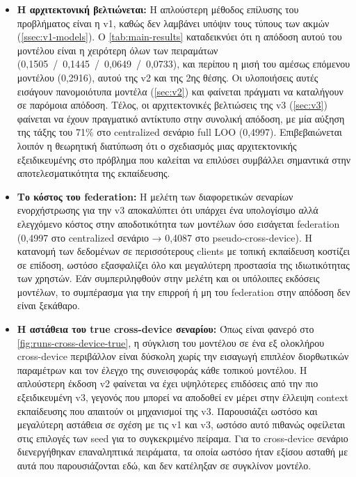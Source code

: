 \begin{itemize}
    \item \textbf{Η αρχιτεκτονική βελτιώνεται:} Η απλούστερη μέθοδος επίλυσης του προβλήματος είναι η v1, καθώς δεν λαμβάνει υπόψιν τους τύπους των ακμών (\autoref{ssec:v1-models}). Ο \autoref{tab:main-results} καταδεικνύει ότι η απόδοση αυτού του μοντέλου είναι η χειρότερη όλων των πειραμάτων (0,1505~/~0,1445~/~0,0649~/~0,0733), και περίπου η μισή του αμέσως επόμενου μοντέλου (0,2916), αυτού της v2 και της 2ης θέσης. Οι υλοποιήσεις αυτές εισάγουν πανομοιότυπα μοντέλα (\autoref{sec:v2}) και φαίνεται πράγματι να καταλήγουν σε παρόμοια απόδοση. Τέλος, οι αρχιτεκτονικές βελτιώσεις της v3 (\autoref{sec:v3}) φαίνεται να έχουν πραγματικό αντίκτυπο στην συνολική απόδοση, με μία αύξηση της τάξης του 71\% στο centralized σενάριο full LOO (0,4997). Επιβεβαιώνεται λοιπόν η θεωρητική διατύπωση ότι ο σχεδιασμός μιας αρχιτεκτονικής εξειδικευμένης στο πρόβλημα που καλείται να επιλύσει συμβάλλει σημαντικά στην αποτελεσματικότητα της εκπαίδευσης.
    \item \textbf{Το κόστος του federation:} Η μελέτη των διαφορετικών σεναρίων ενορχήστρωσης για την v3 αποκαλύπτει ότι υπάρχει ένα υπολογίσιμο αλλά ελεγχόμενο κόστος στην αποδοτικότητα των μοντέλων όσο εισάγεται federation (0,4997 στο centralized σενάριο → 0,4087 στο pseudo-cross-device). Η κατανομή των δεδομένων σε περισσότερους clients με τοπική εκπαίδευση κοστίζει σε επίδοση, ωστόσο εξασφαλίζει όλο και μεγαλύτερη προστασία της ιδιωτικότητας των χρηστών. Εάν συμπεριληφθούν στην μελέτη και οι υπόλοιπες εκδόσεις μοντέλων, το συμπέρασμα για την επιρροή ή μη του federation στην απόδοση δεν είναι ξεκάθαρο.
    \item \textbf{Η αστάθεια του true cross-device σεναρίου:} Όπως είναι φανερό στο \autoref{fig:runs-cross-device-true}, η σύγκλιση του μοντέλου σε ένα εξ ολοκλήρου cross-device περιβάλλον είναι δύσκολη χωρίς την εισαγωγή επιπλέον διορθωτικών παραμέτρων και τον έλεγχο της συνεισφοράς κάθε τοπικού μοντέλου. Η απλούστερη έκδοση v2 φαίνεται να έχει υψηλότερες επιδόσεις από την πιο εξειδικευμένη v3, γεγονός που μπορεί να αποδοθεί εν μέρει στην έλλειψη context εκπαίδευσης που απαιτούν οι μηχανισμοί της v3. Παρουσιάζει ωστόσο και μεγαλύτερη αστάθεια σε σχέση με τις v1 και v3, ωστόσο αυτό πιθανώς οφείλεται στις επιλογές των seed για το συγκεκριμένο πείραμα. Για το cross-device σενάριο διενεργήθηκαν επαναληπτικά πειράματα, τα οποία ωστόσο ήταν εξίσου ασταθή με αυτά που παρουσιάζονται εδώ, και δεν κατέληξαν σε συγκλίνον μοντέλο.
\end{itemize}

